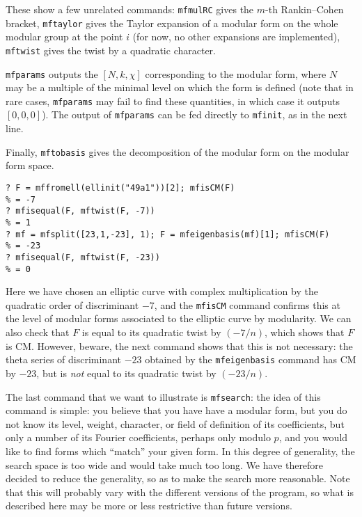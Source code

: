 \documentclass[11pt]{article}
\def\kbd#1{{\tt #1}}
\begin{document}
These show a few unrelated commands: \kbd{mfmulRC} gives the $m$-th
Rankin--Cohen bracket, \kbd{mftaylor} gives the Taylor expansion of
a modular form on the whole modular group at the point $i$ (for now,
no other expansions are implemented), \kbd{mftwist} gives the twist
by a quadratic character.

\kbd{mfparams} outputs the $[N,k,\chi]$ corresponding to the modular form,
where $N$ may be a multiple of the minimal level on which the form is defined
(note that in rare cases, \kbd{mfparams} may fail to find these quantities,
in which case it outputs $[0,0,0]$). The output of \kbd{mfparams} can be
fed directly to \kbd{mfinit}, as in the next line.

Finally, \kbd{mftobasis} gives the decomposition of the modular form
on the modular form space.

\medskip

\begin{verbatim}
? F = mffromell(ellinit("49a1"))[2]; mfisCM(F)
% = -7
? mfisequal(F, mftwist(F, -7))
% = 1
? mf = mfsplit([23,1,-23], 1); F = mfeigenbasis(mf)[1]; mfisCM(F)
% = -23
? mfisequal(F, mftwist(F, -23))
% = 0
\end{verbatim}

Here we have chosen an elliptic curve with complex multiplication by
the quadratic order of discriminant $-7$, and the \kbd{mfisCM} command
confirms this at the level of modular forms associated to the elliptic curve
by modularity. We can also check that $F$ is equal to its quadratic twist
by $(-7/n)$, which shows that $F$ is CM. However, beware, the next command
shows that this is not necessary: the theta series of discriminant $-23$
obtained by the \kbd{mfeigenbasis} command has CM by $-23$, but is \emph{not}
equal to its quadratic twist by $(-23/n)$.

\medskip

The last command that we want to illustrate is \kbd{mfsearch}: the idea
of this command is simple: you believe that you have have a modular form,
but you do not know its level, weight, character, or field of definition
of its coefficients, but only a number of its Fourier coefficients, perhaps
only modulo $p$, and you would like to find forms which ``match'' your
given form. In this degree of generality, the search space is too wide
and would take much too long. We have therefore decided to reduce
the generality, so as to make the search more reasonable. Note that this
will probably vary with the different versions of the program, so what is
described here may be more or less restrictive than future versions.
\end{document}
